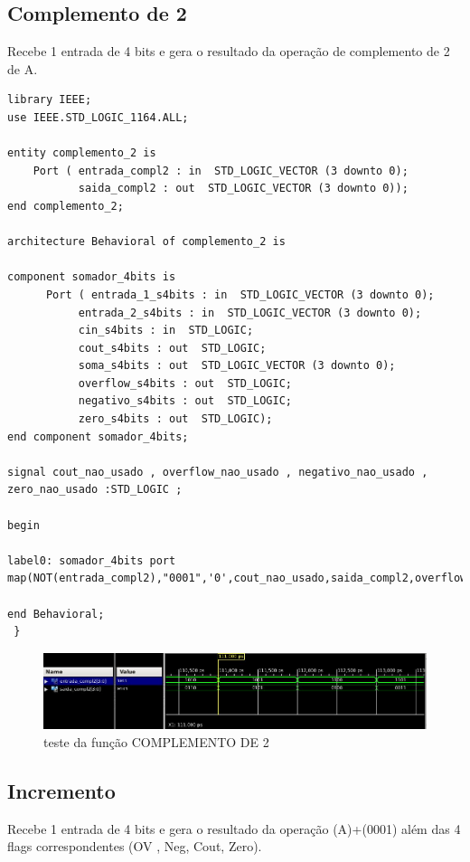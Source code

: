 \documentclass[a4paper,12pt,twoside]{article}
\begin{document}
\subsection{Complemento de 2}
Recebe 1 entrada de 4 bits e gera o resultado da operação de complemento de 2 de A.

\begin{lstlisting}
library IEEE;
use IEEE.STD_LOGIC_1164.ALL;

entity complemento_2 is
    Port ( entrada_compl2 : in  STD_LOGIC_VECTOR (3 downto 0);
           saida_compl2 : out  STD_LOGIC_VECTOR (3 downto 0));
end complemento_2;

architecture Behavioral of complemento_2 is

component somador_4bits is
      Port ( entrada_1_s4bits : in  STD_LOGIC_VECTOR (3 downto 0);
           entrada_2_s4bits : in  STD_LOGIC_VECTOR (3 downto 0);
           cin_s4bits : in  STD_LOGIC;
           cout_s4bits : out  STD_LOGIC;
           soma_s4bits : out  STD_LOGIC_VECTOR (3 downto 0);
           overflow_s4bits : out  STD_LOGIC;
           negativo_s4bits : out  STD_LOGIC;
           zero_s4bits : out  STD_LOGIC);
end component somador_4bits;

signal cout_nao_usado , overflow_nao_usado , negativo_nao_usado , zero_nao_usado :STD_LOGIC ;

begin

label0: somador_4bits port map(NOT(entrada_compl2),"0001",'0',cout_nao_usado,saida_compl2,overflow_nao_usado,negativo_nao_usado,zero_nao_usado);

end Behavioral;
 } \end{lstlisting}
 
   \begin{figure}[H]
\centering
\includegraphics[scale=0.65]{testes/complemento_2_2.jpeg}
\caption{teste da função COMPLEMENTO DE 2}
\label{fig:diagrama}
\end{figure}

\subsection{Incremento}
Recebe 1 entrada de 4 bits e gera o resultado da operação (A)+(0001) além das 4 flags correspondentes (OV , Neg, Cout, Zero).
\end{document}
